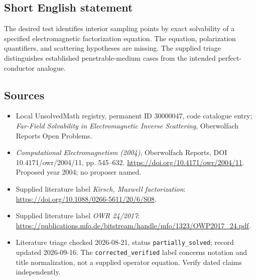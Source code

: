 \documentclass[11pt]{article}
\begin{document}
\subsection{Short English statement}
The desired test identifies interior sampling points by exact solvability of a specified electromagnetic factorization equation. The equation, polarization quantifiers, and scattering hypotheses are missing. The supplied triage distinguishes established penetrable-medium cases from the intended perfect-conductor analogue.
\subsection{Sources}
\begin{itemize}\item Local UnsolvedMath registry, permanent ID 30000047, code catalogue entry; \emph{Far-Field Solvability in Electromagnetic Inverse Scattering}, Oberwolfach Reports Open Problems.\item \emph{Computational Electromagnetism (2004)}, Oberwolfach Reports, DOI 10.4171/owr/2004/11, pp. 545--632. \url{https://doi.org/10.4171/owr/2004/11}. Proposed year 2004; no proposer named.\item Supplied literature label \emph{Kirsch, Maxwell factorization}: \url{https://doi.org/10.1088/0266-5611/20/6/S08}.\item Supplied literature label \emph{OWR 24/2017}: \url{https://publications.mfo.de/bitstream/handle/mfo/1323/OWP2017_24.pdf}.\item Literature triage checked 2026-08-21, status \texttt{partially\_solved}; record updated 2026-09-16. The \texttt{corrected\_verified} label concerns notation and title normalization, not a supplied operator equation. Verify dated claims independently.\end{itemize}
\end{document}
